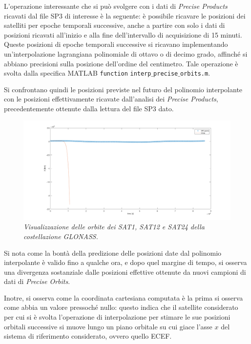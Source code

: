 \documentclass[a4paper,11pt,twoside]{book}
\begin{document}
	L'operazione interessante che si può svolgere con i dati di \textit{Precise Products} ricavati dal file SP3 di interesse è la seguente: è possibile ricavare le posizioni dei satelliti per epoche temporali successive, anche a partire con solo i dati di posizioni ricavati all'inizio e alla fine dell'intervallo di acquisizione di 15 minuti. Queste posizioni di epoche temporali successive si ricavano implementando un'interpolazione lagrangiana polinomiale di ottavo o di decimo grado, affinché si abbiano precisioni sulla posizione dell'ordine del centimetro. Tale operazione è svolta dalla specifica MATLAB \texttt{function} \texttt{interp$\_$precise$\_$orbits.m}.
	
	Si confrontano quindi le posizioni previste nel futuro del polinomio interpolante con le posizioni effettivamente ricavate dall'analisi dei \textit{Precise Products}, precedentemente ottenute dalla lettura del file SP3 dato.\\
	
		\begin{figure}[H]
		\centering
		\includegraphics[scale=0.35]{"Immagini workbook/Immagini esp2/interp111"}
		\caption{\textit{Visualizzazione delle orbite dei SAT1, SAT12 e SAT24 della costellazione GLONASS.}}
		\label{interp111}
	\end{figure}
	
	Si nota come la bontà della predizione delle posizioni date dal polinomio interpolante è valido fino a qualche ora, e dopo quel margine di tempo, si osserva una divergenza sostanziale dalle posizioni effettive ottenute da nuovi campioni di dati di \textit{Precise Orbits}.
	
	Inotre, si osserva come la coordinata cartesiana computata è la prima si osserva come abbia un valore pressoché nullo: questo indica che il satellite considerato per cui si è svolta l'operazione di interpolazione per stimare le sue posizioni orbitali successive si muove lungo un piano orbitale su cui giace l'asse $x$ del sistema di riferimento considerato, ovvero quello ECEF.
	
\end{document}
